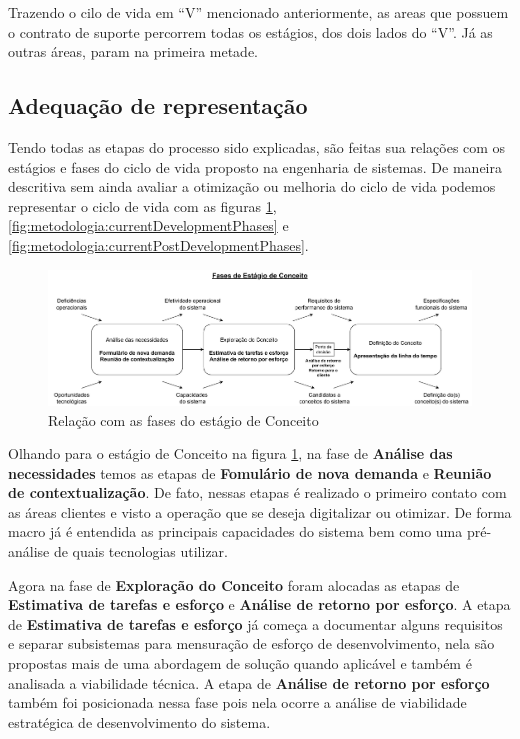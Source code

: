 	Trazendo o cilo de vida em ``V'' mencionado anteriormente, as areas que possuem o contrato de suporte percorrem todas os estágios, dos dois lados do ``V''. Já as outras áreas,
	param na primeira metade.

	\subsection{{\color{blue}Adequação de representação}}

	Tendo todas as etapas do processo sido explicadas, são feitas sua relações com os estágios e fases do ciclo de vida proposto na engenharia de sistemas.
	De maneira descritiva sem ainda avaliar a otimização ou melhoria do ciclo de vida podemos representar o ciclo de vida com as figuras \ref{fig:metodologia:currentConceptPhases}, \ref{fig:metodologia:currentDevelopmentPhases} e \ref{fig:metodologia:currentPostDevelopmentPhases}.
	
	\begin{figure}[h]
		\centering
		\includegraphics[width=\textwidth]{./figuras/currentConceptPhases.pdf}
		\caption{Relação com as fases do estágio de Conceito}
		\label{fig:metodologia:currentConceptPhases}
	\end{figure}

	Olhando para o estágio de Conceito na figura \ref{fig:metodologia:currentConceptPhases}, na fase de \textbf{Análise das necessidades} temos as etapas
	de \textbf{Fomulário de nova demanda} e \textbf{Reunião de contextualização}. De fato, nessas etapas é realizado o primeiro contato com as áreas 
	clientes e visto a operação que se deseja digitalizar ou otimizar. De forma macro já é entendida as principais capacidades do sistema bem como uma pré-análise de quais tecnologias utilizar.

	Agora na fase de \textbf{Exploração do Conceito} foram alocadas as etapas de \textbf{Estimativa de tarefas e esforço} e \textbf{Análise de retorno por esforço}. A etapa de
	\textbf{Estimativa de tarefas e esforço} já começa a documentar alguns requisitos e separar subsistemas para mensuração de esforço de desenvolvimento, nela são propostas mais de uma abordagem
	de solução quando aplicável e também é analisada a viabilidade técnica. A etapa de \textbf{Análise de retorno por esforço} também
	foi posicionada nessa fase pois nela ocorre a análise de viabilidade estratégica de desenvolvimento do sistema.

